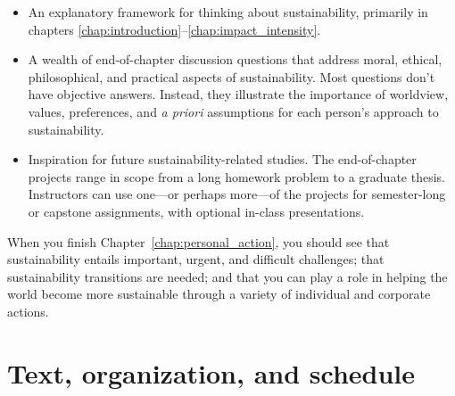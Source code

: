 {\begin{itemize}
    \item An explanatory framework for thinking about sustainability,
    primarily in chapters \ref{chap:introduction}--\ref{chap:impact_intensity}.
    
    \item A wealth of end-of-chapter discussion questions that 
    address moral, ethical, philosophical,
    and practical aspects of sustainability. 
    Most questions don't have objective answers. 
        Instead, they illustrate the importance
        of worldview, values, preferences, and \emph{a priori} assumptions 
        for each person's approach to sustainability. 
    
    \item Inspiration for future sustainability-related studies.
    The end-of-chapter projects range in scope from a long
    homework problem to a graduate thesis. 
    Instructors can use one---or perhaps more---of the projects for
    semester-long or capstone assignments,
    with optional in-class presentations.
    
    \end{itemize}
    
    When you finish Chapter~\ref{chap:personal_action}, you should see
    that sustainability entails important, urgent, and difficult challenges; 
    that sustainability transitions are needed; and 
    that you can play a role in helping the world become more sustainable
    through a variety of individual and corporate actions.
    
    
      \section*{Text, organization, and schedule} 
    
}
